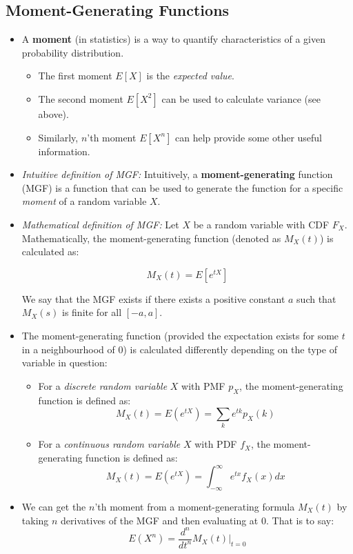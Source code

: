 \documentclass[12pt]{article}
\begin{document}
\subsection{Moment-Generating Functions}

\begin{itemize}
	\item A \textbf{moment} (in statistics) is a way to quantify characteristics of a given probability distribution.
	      \begin{itemize}
		      \item The first moment $E[X]$ is the \textit{expected value}.
		      \item The second moment $E[X^2]$ can be used to calculate variance (see above).
		      \item Similarly, $n$'th moment $E[X^n]$ can help provide some other useful information.
	      \end{itemize}
	\item \textit{Intuitive definition of MGF:} Intuitively, a
	      \textbf{moment-generating} function (MGF) is a function that can be
	      used to generate the function for a specific \textit{moment} of a
	      random variable $X$.
	\item \textit{Mathematical definition of MGF:} Let $X$ be a random variable
	      with CDF $F_X$. Mathematically, the moment-generating function (denoted
	      as $M_X(t)$) is calculated as:

	      \[
		      M_X(t) = E[e^{tX}]
	      \]

	      We say that the MGF exists if there exists a positive constant $a$
	      such that $M_X(s)$ is finite for all $[-a, a]$.

	\item The moment-generating function (provided the expectation exists for
	      some $t$ in a neighbourhood of $0$) is calculated differently depending
	      on the type of variable in question:
	      \begin{itemize}
		      \item For a \textit{discrete random variable} $X$ with PMF
		            $p_X$, the moment-generating function is defined as: \[
			            M_X(t) = E(e^{tX}) = \displaystyle\sum_{k} e^{tk}p_X(k)
		            \]
		      \item For a \textit{continuous random variable} $X$ with PDF
		            $f_X$, the moment-generating function is defined as: \[
			            M_X(t) = E(e^{tX}) = \int_{-\infty}^{\infty} e^{tx} f_X(x) dx
		            \]
	      \end{itemize}
	\item We can get the $n$'th moment from a moment-generating formula $M_X(t)$ by taking $n$ derivatives of the MGF and then evaluating at $0$. That is to say:
	      \[
		      E(X^n) = \frac{d^n}{dt^n} M_X(t)\Bigr\rvert_{t=0}
	      \]
\end{itemize}
\end{document}
